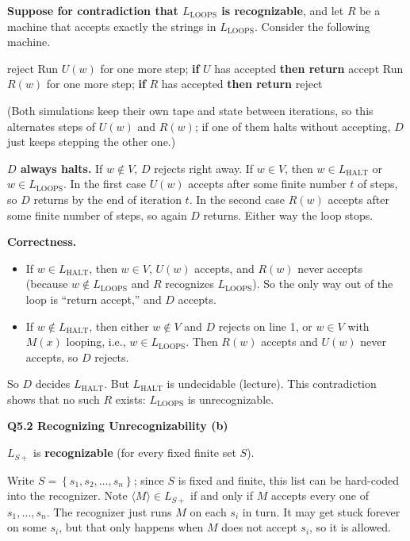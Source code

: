 \documentclass[11pt]{article}
\newcommand{\set}[1]{\left\{#1\right\}}
\newcommand{\inner}[1]{\langle #1 \rangle}
\newcommand{\Lh}{L_{\text{HALT}}}
\newcommand{\Lloops}{L_{\text{LOOPS}}}
\newcommand{\LSp}{L_{S+}}
\newcommand{\qpage}[1]{\clearpage\noindent\textbf{\large #1}\par\medskip}
\begin{document}
\textbf{Suppose for contradiction that $\Lloops$ is recognizable}, and let $R$ be a machine that accepts exactly the strings in $\Lloops$.
Consider the following machine.

\begin{algorithmic}[1]
  \Ensure{accept if $w \in \Lh$, reject otherwise}
     \Return reject 
    \EndIf
    \Loop
      \State Run $U(w)$ for one more step; \textbf{if} $U$ has accepted \textbf{then return} accept
      \State Run $R(w)$ for one more step; \textbf{if} $R$ has accepted \textbf{then return} reject
    \EndLoop
  \EndFunction
\end{algorithmic}
(Both simulations keep their own tape and state between iterations, so this alternates steps of $U(w)$ and $R(w)$; if one of them halts without accepting, $D$ just keeps stepping the other one.)

\textbf{$D$ always halts.}
If $w \notin V$, $D$ rejects right away.
If $w \in V$, then $w \in \Lh$ or $w \in \Lloops$.
In the first case $U(w)$ accepts after some finite number $t$ of steps, so $D$ returns by the end of iteration $t$.
In the second case $R(w)$ accepts after some finite number of steps, so again $D$ returns.
Either way the loop stops.

\textbf{Correctness.}
\begin{itemize}
  \item If $w \in \Lh$, then $w \in V$, $U(w)$ accepts, and $R(w)$ never accepts (because $w \notin \Lloops$ and $R$ recognizes $\Lloops$).
  So the only way out of the loop is ``return accept,'' and $D$ accepts.
  \item If $w \notin \Lh$, then either $w \notin V$ and $D$ rejects on line 1, or $w \in V$ with $M(x)$ looping, i.e., $w \in \Lloops$.
  Then $R(w)$ accepts and $U(w)$ never accepts, so $D$ rejects.
\end{itemize}
So $D$ decides $\Lh$.
But $\Lh$ is undecidable (lecture).
This contradiction shows that no such $R$ exists: $\Lloops$ is unrecognizable.

\qpage{Q5.2 Recognizing Unrecognizability (b)}

$\LSp$ is \textbf{recognizable} (for every fixed finite set $S$).

Write $S = \set{s_1, s_2, \ldots, s_n}$; since $S$ is fixed and finite, this list can be hard-coded into the recognizer.
Note $\inner{M} \in \LSp$ if and only if $M$ accepts every one of $s_1, \ldots, s_n$.
The recognizer just runs $M$ on each $s_i$ in turn.
It may get stuck forever on some $s_i$, but that only happens when $M$ does not accept $s_i$, so it is allowed.
\end{document}

